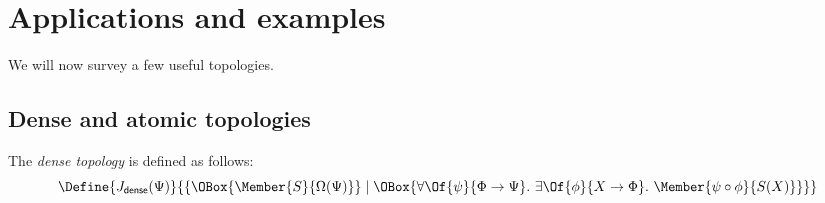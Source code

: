 \documentclass{article}
\newcommand\Psh[1]{\widehat{#1}}
\newcommand\Sh[1]{\mathbf{Sh} (#1)}
\newcommand\IsSubobject[3]{\IMode{#1}\rightarrowtail\IMode{#2}:\IMode{#3}}
\newcommand\One{\mathbf{1}}
\newcommand\JDense{J_{\mathsf{dense}}}
\newcommand\True{\mathsf{true}}
\newcommand\MkSet[1]{\{#1\}}
\begin{document}




\newpage
\section{Applications and examples}

We will now survey a few useful topologies.

\subsection{Dense and atomic topologies}

\begin{definition}
  The \emph{dense topology} is defined as follows:
  \[
    \Define{
      \JDense(\Psi)
    }{
      \MkSet{
        \OBox{
          \Member{S}{\Omega(\Psi)}
        }
        \mid
        \OBox{
          \forall\Of{\psi}{\Phi\to\Psi}.\
          \exists\Of{\phi}{X\to\Phi}.\
          \Member{\psi\circ \phi}{S(X)}
        }
      }
    }
  \]
\end{definition}
\end{document}
